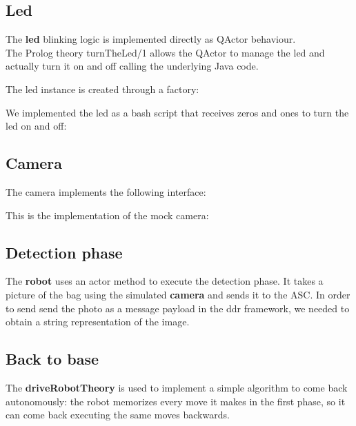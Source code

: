 \documentclass{llncs}
\begin{document}
\subsection{Led}
The \textbf{led} blinking logic is implemented directly as QActor behaviour.\\
The Prolog theory turnTheLed/1 allows the QActor to manage the led and actually turn it on and off calling the underlying Java code.

The led instance is created through a factory:

We implemented the led as a bash script that receives zeros and ones to turn the led on and off:


\subsection{Camera}
The camera implements the following interface:

This is the implementation of the mock camera:

\subsection{Detection phase}
The \textbf{robot} uses an actor method to execute the detection phase. It takes a picture of the bag using the simulated \textbf{camera} and sends it to the ASC. In order to send send the photo as a message payload in the ddr framework, we needed to obtain a string representation of the image.\\

\subsection{Back to base}
The \textbf{driveRobotTheory} is used to implement a simple algorithm to come back autonomously: the robot memorizes every move it makes in the first phase, so it can come back executing the same moves backwards.\\

\end{document}
